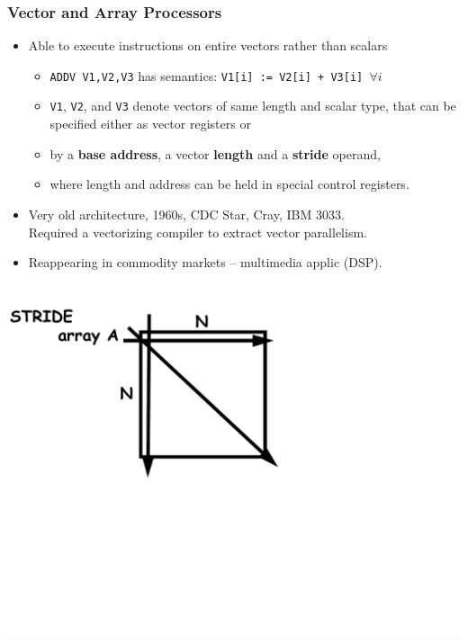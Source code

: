 \documentclass{beamer}
\newcommand{\emp}[1]{\textcolor{DikuRed}{ #1}}
\begin{document}
\begin{frame}[fragile,t]
\frametitle{Vector and Array Processors}

\begin{itemize}
    \item Able to execute instructions on entire vectors rather than scalars\medskip
    \begin{itemize}
        \item {\tt ADDV V1,V2,V3} has semantics: 
                {\tt V1[i] := V2[i] + V3[i] $\forall i$}\smallskip
        \item {\tt V1}, {\tt V2}, and  {\tt V3} denote vectors of same 
                length and scalar type, that can be specified either 
                as vector registers or\smallskip
        \item by a \emp{\bf base address}, a vector \emp{\bf length} 
                and a \emp{\bf stride} operand,\smallskip
        \item where length and address can be held in special control registers.
    \end{itemize}\medskip

    \item Very old architecture, 1960s, CDC Star, Cray, IBM 3033.\\
            Required a vectorizing compiler to extract vector parallelism.\medskip 

    \item \alert{Reappearing in commodity markets --
                    multimedia applic (DSP).} 
\end  {itemize}

\vspace{-1ex}

\begin{columns}
\includegraphics[width=55ex]{Ch1Figs/MatrixStrides}\pause
{}
\vspace{-15ex}


\end{columns}
\end{frame}
\end{document}
